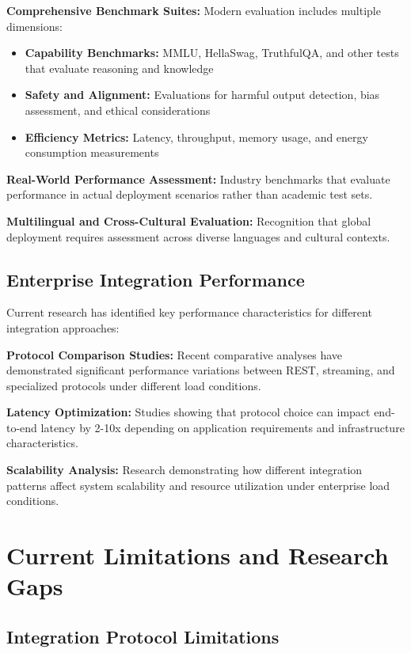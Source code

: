 \textbf{Comprehensive Benchmark Suites:} Modern evaluation includes multiple dimensions:
\begin{itemize}
    \item \textbf{Capability Benchmarks:} MMLU, HellaSwag, TruthfulQA, and other tests that evaluate reasoning and knowledge
    \item \textbf{Safety and Alignment:} Evaluations for harmful output detection, bias assessment, and ethical considerations
    \item \textbf{Efficiency Metrics:} Latency, throughput, memory usage, and energy consumption measurements
\end{itemize}

\textbf{Real-World Performance Assessment:} Industry benchmarks that evaluate performance in actual deployment scenarios rather than academic test sets.

\textbf{Multilingual and Cross-Cultural Evaluation:} Recognition that global deployment requires assessment across diverse languages and cultural contexts.

\subsection{Enterprise Integration Performance}

Current research has identified key performance characteristics for different integration approaches:

\textbf{Protocol Comparison Studies:} Recent comparative analyses \cite{claudePerformanceComparison} have demonstrated significant performance variations between REST, streaming, and specialized protocols under different load conditions.

\textbf{Latency Optimization:} Studies showing that protocol choice can impact end-to-end latency by 2-10x depending on application requirements and infrastructure characteristics.

\textbf{Scalability Analysis:} Research demonstrating how different integration patterns affect system scalability and resource utilization under enterprise load conditions.

\section{Current Limitations and Research Gaps}

\subsection{Integration Protocol Limitations}

